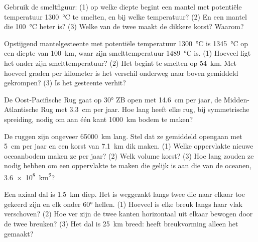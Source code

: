 \begin{exercise}[$\star\star$]\label{exo:g11:ocean-ridges:6}
Gebruik de smeltfiguur: (1) op welke diepte begint een mantel met potentiële
temperatuur \qty{1300}{\celsius} te smelten, en bij welke temperatuur? (2)
En een mantel die \qty{100}{\celsius} heter is? (3) Welke van de twee maakt de
dikkere korst? Waarom?
\end{exercise}

\begin{exercise}[$\star\star$]\label{exo:g11:ocean-ridges:7}
Opstijgend mantelgesteente met potentiële temperatuur \qty{1300}{\celsius} is
\qty{1345}{\celsius} op een diepte van \qty{100}{km}, waar zijn smelttemperatuur
\qty{1489}{\celsius} is. (1) Hoeveel ligt het onder zijn
smelttemperatuur? (2) Het begint te smelten op \qty{54}{km}. Met hoeveel graden
per kilometer is het verschil onderweg naar boven gemiddeld gekrompen? (3) Is het
gesteente verhit?
\end{exercise}

\begin{exercise}[$\star\star$]\label{exo:g11:ocean-ridges:8}
De Oost-Pacifische Rug gaat op \ang{30} ZB open met \qty{14.6}{cm} per jaar, de
Midden-Atlantische Rug met \qty{3.3}{cm} per jaar. Hoe lang heeft elke rug, bij
symmetrische spreiding, nodig om aan één kant \qty{1000}{km} bodem te maken?
\end{exercise}

\begin{exercise}[$\star\star$]\label{exo:g11:ocean-ridges:9}
De ruggen zijn ongeveer \qty{65000}{km} lang. Stel dat ze gemiddeld opengaan met
\qty{5}{cm} per jaar en een korst van \qty{7.1}{km} dik maken. (1) Welke oppervlakte
nieuwe oceaanbodem maken ze per jaar? (2) Welk volume korst? (3) Hoe lang
zouden ze nodig hebben om een oppervlakte te maken die gelijk is aan die van de oceanen,
\qty{3.6e8}{km^2}?
\end{exercise}

\begin{exercise}[$\star\star$]\label{exo:g11:ocean-ridges:10}
Een axiaal dal is \qty{1.5}{km} diep. Het is weggezakt langs twee 
die naar elkaar toe gekeerd zijn en elk onder \ang{60} hellen. (1) Hoeveel is elke breuk
langs haar vlak verschoven? (2) Hoe ver zijn de twee kanten horizontaal uit elkaar
bewogen door de twee breuken? (3) Het dal is \qty{25}{km} breed: heeft breukvorming
alleen het gemaakt?
\end{exercise}

